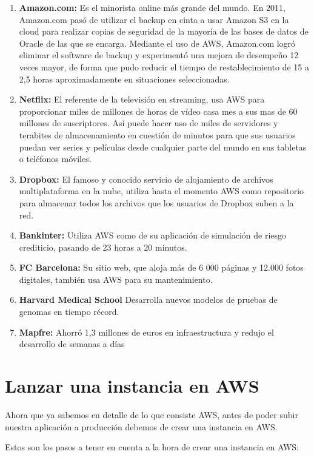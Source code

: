 \begin{enumerate}
     \item \textbf{Amazon.com: } Es el minorista online más grande del mundo. En 2011, Amazon.com pasó de utilizar el backup en cinta a usar Amazon S3 en la cloud para realizar copias de seguridad de la mayoría de las bases de datos de Oracle de las que se encarga. Mediante el uso de AWS, Amazon.com logró eliminar el software de backup y experimentó una mejora de desempeño 12 veces mayor, de forma que pudo reducir el tiempo de restablecimiento de 15 a 2,5 horas aproximadamente en situaciones seleccionadas.
    \item \textbf{Netflix: } El referente de la televisión en streaming, usa AWS para proporcionar miles de millones de horas de vídeo casa mes a sus mas de 60 millones de suscriptores. Así puede hacer uso de miles de servidores y terabites de almacenamiento en cuestión de minutos para que sus usuarios puedan ver series y películas desde cualquier parte del mundo en sus tabletas o teléfonos móviles.
    \item \textbf{Dropbox: } El famoso y conocido servicio de alojamiento de archivos multiplataforma en la nube, utiliza hasta el momento AWS como repositorio para almacenar todos los archivos que los usuarios de Dropbox suben a la red. 
    \item \textbf{Bankinter: } Utiliza AWS como de su aplicación de simulación de riesgo crediticio, pasando de 23 horas a 20 minutos.
    \item \textbf{FC Barcelona: }Su sitio web, que aloja más de 6 000 páginas y 12.000 fotos digitales, también usa AWS para su mantenimiento.
    \item \textbf{Harvard Medical School} Desarrolla nuevos modelos de pruebas de genomas en tiempo récord. 
    \item \textbf{Mapfre: }Ahorró 1,3 millones de euros en infraestructura y redujo el desarrollo de semanas a días
    
\end{enumerate}

\section{Lanzar una instancia en AWS}

Ahora que ya sabemos en detalle de lo que consiste AWS, antes de poder subir nuestra aplicación a producción debemos de crear una instancia en AWS.

Estos son los pasos a tener en cuenta a la hora de crear una instancia en AWS:

